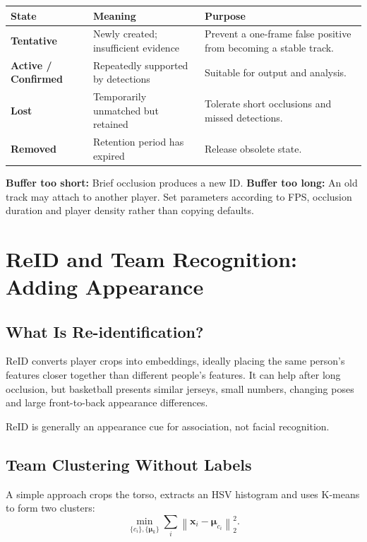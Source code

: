 \documentclass[11pt,a4paper,oneside]{report}
\begin{document}
\begin{tabularx}{\textwidth}{>{\bfseries\RaggedRight}p{2.6cm} Y Y}
\toprule
State & Meaning & Purpose \\
\midrule
Tentative & Newly created; insufficient evidence & Prevent a one-frame false positive from becoming a stable track.\\
Active / Confirmed & Repeatedly supported by detections & Suitable for output and analysis.\\
Lost & Temporarily unmatched but retained & Tolerate short occlusions and missed detections.\\
Removed & Retention period has expired & Release obsolete state.\\
\bottomrule
\end{tabularx}

\begin{riskBox}
\textbf{Buffer too short:} Brief occlusion produces a new ID.\quad
\textbf{Buffer too long:} An old track may attach to another player.\quad
Set parameters according to FPS, occlusion duration and player density rather than copying defaults.
\end{riskBox}

\section{ReID and Team Recognition: Adding Appearance}

\subsection{What Is Re-identification?}

ReID converts player crops into embeddings, ideally placing the same person's features closer together than different people's features. It can help after long occlusion, but basketball presents similar jerseys, small numbers, changing poses and large front-to-back appearance differences.

ReID is generally an appearance cue for association, not facial recognition.

\subsection{Team Clustering Without Labels}

A simple approach crops the torso, extracts an HSV histogram and uses K-means to form two clusters:
\[
\min_{\{c_i\},\{\boldsymbol\mu_k\}}
\sum_i\left\|\mathbf x_i-\boldsymbol\mu_{c_i}\right\|_2^2.
\]
\end{document}
